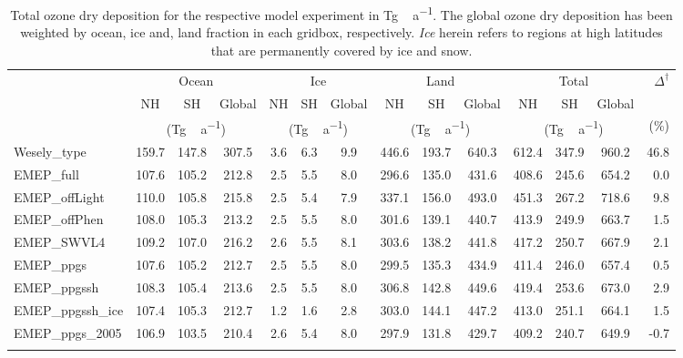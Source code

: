 \documentclass[gmd, manuscript]{copernicus}
\begin{document}
\begin{table}[t]
  \caption{Total ozone dry deposition for the respective model experiment in \unit{Tg\,a^{-1}}. The global ozone dry deposition has been weighted by ocean, ice and, land fraction in each gridbox, respectively. \emph{Ice} herein refers to regions at high latitudes that are permanently covered by ice and snow.}
  \begin{tabular}{lccccccccc|cccr}
    \tophline
    \multirow{3}{*}{Experiment} & \multicolumn{3}{c}{Ocean} & \multicolumn{3}{c}{Ice} & \multicolumn{3}{c}{Land} & \multicolumn{3}{c}{Total} & $\Delta^\dagger$\\
    & NH & SH & Global & NH & SH & Global & NH & SH & Global & NH & SH & Global\\
    & \multicolumn{3}{c}{(\unit{Tg\,a^{-1}})} & \multicolumn{3}{c}{(\unit{Tg\,a^{-1}})} & \multicolumn{3}{c}{(\unit{Tg\,a^{-1}})} & \multicolumn{3}{c}{(\unit{Tg\,a^{-1}})} & (\unit{\%})\\
    \middlehline
    Wesely\_type & 159.7 & 147.8 & 307.5 & 3.6 & 6.3 & 9.9 & 446.6 & 193.7 & 640.3 & 612.4 & 347.9 & 960.2 & 46.8\\
    EMEP\_full & 107.6 & 105.2 & 212.8 & 2.5 & 5.5 & 8.0 & 296.6 & 135.0 & 431.6 & 408.6 & 245.6 & 654.2 & 0.0\\
    EMEP\_offLight & 110.0 & 105.8 & 215.8 & 2.5 & 5.4 & 7.9 & 337.1 & 156.0 & 493.0 & 451.3 & 267.2 & 718.6 & 9.8\\
    EMEP\_offPhen & 108.0 & 105.3 & 213.2 & 2.5 & 5.5 & 8.0 & 301.6 & 139.1 & 440.7 & 413.9 & 249.9 & 663.7 & 1.5\\
    EMEP\_SWVL4 & 109.2 & 107.0 & 216.2 & 2.6 & 5.5 & 8.1 & 303.6 & 138.2 & 441.8 & 417.2 & 250.7 & 667.9 & 2.1\\
    EMEP\_ppgs & 107.6 & 105.2 & 212.7 & 2.5 & 5.5 & 8.0 & 299.5 & 135.3 & 434.9 & 411.4 & 246.0 & 657.4 & 0.5\\
    EMEP\_ppgssh & 108.3 & 105.4 & 213.6 & 2.5 & 5.5 & 8.0 & 306.8 & 142.8 & 449.6 & 419.4 & 253.6 & 673.0 & 2.9\\
    EMEP\_ppgssh\_ice & 107.4 & 105.3 & 212.7 & 1.2 & 1.6 & 2.8 & 303.0 & 144.1 & 447.2 & 413.0 & 251.1 & 664.1 & 1.5\\
    EMEP\_ppgs\_2005 & 106.9 & 103.5 & 210.4 & 2.6 & 5.4 & 8.0 & 297.9 & 131.8 & 429.7 & 409.2 & 240.7 & 649.9 & -0.7\\
    \bottomhline
  \end{tabular}
  \label{tab:ozone_sinks}
\end{table}
\end{document}
